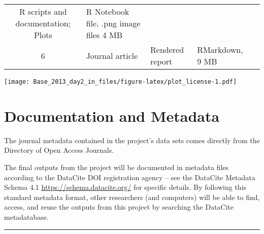 \documentclass[]{article}
\begin{document}
\begin{longtable}[]{@{}cllll@{}}
\begin{minipage}[t]{0.16\columnwidth}
R scripts and documentation; Plots\strut
\end{minipage} & \begin{minipage}[t]{0.14\columnwidth}\raggedright\strut
R Notebook file, .png image files 4 MB\strut
\end{minipage} & \begin{minipage}[t]{0.18\columnwidth}\raggedright\strut
\strut
\end{minipage}\tabularnewline
\begin{minipage}[t]{0.11\columnwidth}\centering\strut
6\strut
\end{minipage} & \begin{minipage}[t]{0.11\columnwidth}\raggedright\strut
Journal article\strut
\end{minipage} & \begin{minipage}[t]{0.16\columnwidth}\raggedright\strut
Rendered report\strut
\end{minipage} & \begin{minipage}[t]{0.14\columnwidth}\raggedright\strut
RMarkdown, 9 MB\strut
\end{minipage} & \begin{minipage}[t]{0.18\columnwidth}\raggedright\strut
\strut
\end{minipage}\tabularnewline
\bottomrule
\end{longtable}

\texttt{[image: Base\_2013\_day2\_in\_files/figure-latex/plot\_license-1.pdf]}

\section{Documentation and Metadata}\label{documentation-and-metadata}

The journal metadata contained in the project's data sets comes directly
from the Directory of Open Access Journals.

The final outputs from the project will be documented in metadata files
according to the DataCite DOI registration agency -- see the DataCite
Metadata Schema 4.1 \url{https://schema.datacite.org/} for specific
details. By following this standard metadata format, other researchers
(and computers) will be able to find, access, and reuse the outputs from
this project by searching the DataCite metadatabase.

\begin{center}\rule{0.5\linewidth}{\linethickness}\end{center}
\end{document}
